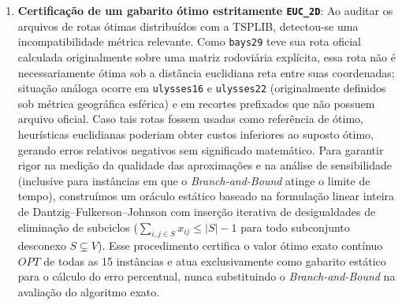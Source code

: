 \begin{enumerate}
  \item \textbf{Certificação de um gabarito ótimo estritamente \texttt{EUC\_2D}}: Ao auditar
  os arquivos de rotas ótimas distribuídos com a TSPLIB, detectou-se uma incompatibilidade
  métrica relevante. Como \texttt{bays29} teve sua rota oficial calculada originalmente sobre
  uma matriz rodoviária explícita, essa rota não é necessariamente ótima sob a distância
  euclidiana reta entre suas coordenadas; situação análoga ocorre em \texttt{ulysses16} e
  \texttt{ulysses22} (originalmente definidos sob métrica geográfica esférica) e em recortes
  prefixados que não possuem arquivo oficial. Caso tais rotas fossem usadas como referência de
  ótimo, heurísticas euclidianas poderiam obter custos inferiores ao suposto ótimo, gerando
  erros relativos negativos sem significado matemático. Para garantir rigor na medição da
  qualidade das aproximações e na análise de sensibilidade (inclusive para instâncias em que o
  \textit{Branch-and-Bound} atinge o limite de tempo), construímos um oráculo estático 
  baseado na formulação linear inteira de Dantzig--Fulkerson--Johnson \cite{dantzig1954solution}
  com inserção iterativa de desigualdades de eliminação de subciclos
  ($\sum_{i, j \in S} x_{ij} \le |S| - 1$ para todo subconjunto desconexo $S \subsetneq V$).
  Esse procedimento certifica o valor ótimo exato contínuo $OPT$ de todas as 15 instâncias e
  atua exclusivamente como gabarito estático para o cálculo do erro percentual, nunca
  substituindo o \textit{Branch-and-Bound} na avaliação do algoritmo exato.
\end{enumerate}
